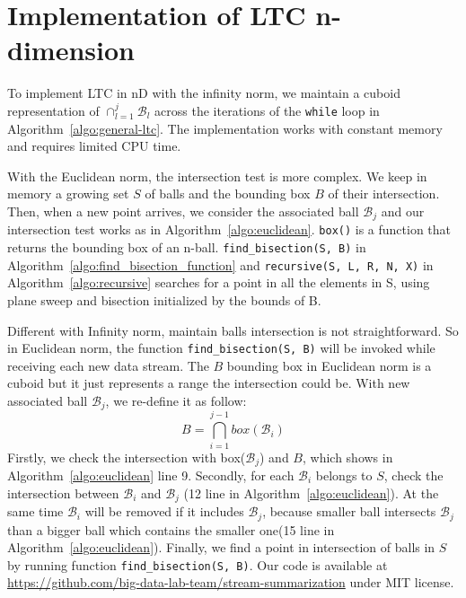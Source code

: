 \section{Implementation of LTC n-dimension}
To implement LTC in nD with the infinity norm, we maintain a cuboid
representation of $\cap_{l=1}^j{\mathcal{B}_l}$ across the
iterations of the \texttt{while} loop in
Algorithm~\ref{algo:general-ltc}. The implementation works with
constant memory and requires limited CPU time.

With the Euclidean norm, the intersection test is more complex. We keep in
memory a growing set $S$ of balls and the bounding box $B$ of their
intersection. Then, when a new point arrives, we consider the associated ball
$\mathcal{B}_j$ and our intersection test works as in
Algorithm~\ref{algo:euclidean}. \texttt{box()} is a function that returns the
bounding box of an n-ball. \texttt{find\_bisection(S, B)} in
Algorithm~\ref{algo:find_bisection_function} and \texttt{recursive(S, L, R, N,
X)} in Algorithm~\ref{algo:recursive} searches for a point in all the  elements
in S, using plane sweep and bisection initialized by the bounds of B.


Different with Infinity norm, maintain balls intersection is not
straightforward. So in Euclidean norm, the function  \texttt{find\_bisection(S,
B)} will be invoked while receiving each new data  stream. The $B$ bounding box
in Euclidean norm is a cuboid but it just  represents a range the intersection
could be. With new associated ball  $\mathcal{B}_j$, we re-define it as follow:
\begin{equation*}
    B = \bigcap_{i=1}^{j-1} box(\mathcal{B}_i) 
\end{equation*}
Firstly, we check the intersection with box($\mathcal{B}_j$) and $B$, which
shows in Algorithm~\ref{algo:euclidean} line 9. Secondly, for each
$\mathcal{B}_i$ belongs to $S$, check the intersection between $\mathcal{B}_i$
and $\mathcal{B}_j$ (12 line in Algorithm~\ref{algo:euclidean}). At the same
time $\mathcal{B}_i$ will be removed if it includes $\mathcal{B}_j$, because
smaller ball intersects $\mathcal{B}_j$ than a bigger ball which contains the
smaller one(15 line in Algorithm~\ref{algo:euclidean}). Finally, we find a point
in intersection of balls in $S$ by running function \texttt{find\_bisection(S,
B)}. Our code is available at
\url{https://github.com/big-data-lab-team/stream-summarization} under MIT
license.



